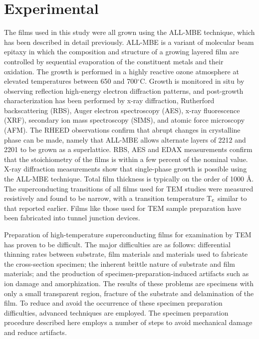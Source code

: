 \section{Experimental}

The films used in this study were all grown using the ALL-MBE
technique, which has been described in detail
previously.\cite{eckstein2} ALL-MBE is a variant of molecular beam
epitaxy in which the composition and structure of a growing layered
film are controlled by sequential evaporation of the constituent
metals and their oxidation.  The growth is performed in a highly
reactive ozone atmosphere at elevated temperatures between 650 and
700$^{\circ}$C.  Growth is monitored in situ by observing reflection
high-energy electron diffraction patterns, and post-growth
characterization has been performed by x-ray diffraction, Rutherford
backscattering (RBS), Auger electron spectroscopy (AES), x-ray
fluorescence (XRF), secondary ion mass spectroscopy (SIMS), and atomic
force microscopy (AFM).  The RHEED observations confirm that abrupt
changes in crystalline phase can be made, namely that ALL-MBE allows
alternate layers of 2212 and 2201 to be grown as a
superlattice.\cite{eckstein} RBS, AES and EDAX measurements confirm
that the stoichiometry of the films is within a few percent of the
nominal value.\cite{howell} X-ray diffraction measurements show that
single-phase growth is possible using the ALL-MBE
technique.\cite{schlom} Total film thickness is typically on the order
of 1000 \AA.  The superconducting transitions of all films used for
TEM studies were measured resistively and found to be narrow, with a
transition temperature T$\rm _c$ similar to that reported
earlier.\cite{bozovic} Films like those used for TEM sample
preparation have been fabricated into tunnel junction
devices.\cite{eckstein2}

Preparation of high-temperature superconducting films for examination
by TEM has proven to be difficult.  The major difficulties are as
follows: differential thinning rates between substrate, film materials
and materials used to fabricate the cross-section specimen; the
inherent brittle nature of substrate and film materials; and the
production of specimen-preparation-induced artifacts such as ion
damage and amorphization.  The results of these problems are specimens
with only a small transparent region, fracture of the substrate and
delamination of the film.  To reduce and avoid the occurrence of these
specimen preparation difficulties, advanced techniques are employed.
The specimen preparation procedure described here employs a number of
steps to avoid mechanical damage and reduce artifacts.

